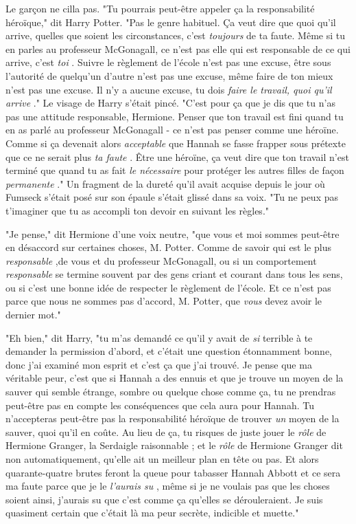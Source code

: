 Le garçon ne cilla pas. "Tu pourrais peut-être appeler ça la responsabilité héroïque," dit Harry Potter. "Pas le genre habituel. Ça veut dire que quoi qu'il arrive, quelles que soient les circonstances, c'est \emph{toujours}  de ta faute. Même si tu en parles au professeur McGonagall, ce n'est pas elle qui est responsable de ce qui arrive, c'est \emph{toi} . Suivre le règlement de l'école n'est pas une excuse, être sous l'autorité de quelqu'un d'autre n'est pas une excuse, même faire de ton mieux n'est pas une excuse. Il n'y a aucune excuse, tu dois \emph{faire le travail, quoi qu'il arrive} ." Le visage de Harry s'était pincé. "C'est pour ça que je dis que tu n'as pas une attitude responsable, Hermione. Penser que ton travail est fini quand tu en as parlé au professeur McGonagall - ce n'est pas penser comme une héroïne. Comme si ça devenait alors \emph{acceptable}  que Hannah se fasse frapper sous prétexte que ce ne serait plus \emph{ta faute} . Être une héroïne, ça veut dire que ton travail n'est terminé que quand tu as fait \emph{le nécessaire}  pour protéger les autres filles de façon \emph{permanente} ." Un fragment de la dureté qu'il avait acquise depuis le jour où Fumseck s'était posé sur son épaule s'était glissé dans sa voix. "Tu ne peux pas t'imaginer que tu as accompli ton devoir en suivant les règles."

"Je pense," dit Hermione d'une voix neutre, "que vous et moi sommes peut-être en désaccord sur certaines choses, M. Potter. Comme de savoir qui est le plus \emph{responsable} ,de vous et du professeur McGonagall, ou si un comportement \emph{responsable}  se termine souvent par des gens criant et courant dans tous les sens, ou si c'est une bonne idée de respecter le règlement de l'école. Et ce n'est pas parce que nous ne sommes pas d'accord, M. Potter, que \emph{vous}  devez avoir le dernier mot."

"Eh bien," dit Harry, "tu m'as demandé ce qu'il y avait de \emph{si}  terrible à te demander la permission d'abord, et c'était une question étonnamment bonne, donc j'ai examiné mon esprit et c'est ça que j'ai trouvé. Je pense que ma véritable peur, c'est que si Hannah a des ennuis et que je trouve un moyen de la sauver qui semble étrange, sombre ou quelque chose comme ça, tu ne prendras peut-être pas en compte les conséquences que cela aura pour Hannah. Tu n'accepteras peut-être pas la responsabilité héroïque de trouver \emph{un}  moyen de la sauver, quoi qu'il en coûte. Au lieu de ça, tu risques de juste jouer le \emph{rôle}  de Hermione Granger, la Serdaigle raisonnable ; et le \emph{rôle}  de Hermione Granger dit non automatiquement, qu'elle ait un meilleur plan en tête ou pas. Et alors quarante-quatre brutes feront la queue pour tabasser Hannah Abbott et ce sera ma faute parce que je le \emph{l'aurais su} , même si je ne voulais pas que les choses soient ainsi, j'aurais su que c'est comme ça qu'elles se dérouleraient. Je suis quasiment certain que c'était là ma peur secrète, indicible et muette."

